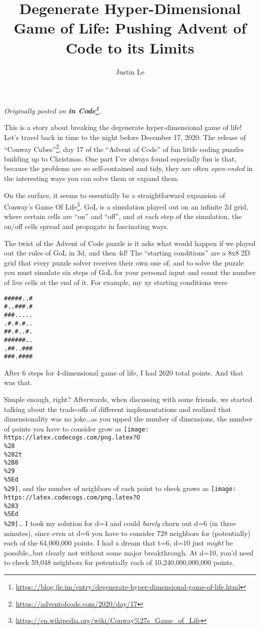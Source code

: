 \documentclass[]{article}
\title{Degenerate Hyper-Dimensional Game of Life: Pushing Advent of Code to its Limits}
\author{Justin Le}
\renewcommand{\href}[2]{#2\footnote{\url{#1}}}
\begin{document}
\maketitle

\emph{Originally posted on
\textbf{\href{https://blog.jle.im/entry/degenerate-hyper-dimensional-game-of-life.html}{in
Code}}.}

This is a story about breaking the degenerate hyper-dimensional game of life!
Let's travel back in time to the night before December 17, 2020: The release of
\href{https://adventofcode.com/2020/day/17}{``Conway Cubes''}, day 17 of the
``Advent of Code'' of fun little coding puzzles building up to Christmas. One
part I've always found especially fun is that, because the problems are so
self-contained and tidy, they are often \emph{open-ended} in the interesting
ways you can solve them or expand them.

On the surface, it seems to essentially be a straightforward expansion of
\href{https://en.wikipedia.org/wiki/Conway\%27s_Game_of_Life}{Conway's Game Of
Life}. GoL is a simulation played out on an infinite 2d grid, where certain
cells are ``on'' and ``off'', and at each step of the simulation, the on/off
cells spread and propagate in fascinating ways.

The twist of the Advent of Code puzzle is it asks what would happen if we played
out the rules of GoL in 3d, and then 4d! The ``starting conditions'' are a 8x8
2D grid that every puzzle solver receives their own one of, and to solve the
puzzle you must simulate six steps of GoL for your personal input and count the
number of live cells at the end of it. For example, my xy starting conditions
were

\begin{verbatim}
#####..#
#..###.#
###.....
.#.#.#..
##.#..#.
######..
.##..###
###.####
\end{verbatim}

After 6 steps for 4-dimensional game of life, I had 2620 total points. And that
was that.

Simple enough, right? Afterwards, when discussing with some friends, we started
talking about the trade-offs of different implementations and realized that
dimensionality was no joke\ldots as you upped the number of dimensions, the
number of points you have to consider grow as
\texttt{[image: https://latex.codecogs.com/png.latex?O\\\%28\\\%282t\\\%2B8\\\%29\\\%5Ed\\\%29]},
and the number of neighbors of each point to check grows as
\texttt{[image: https://latex.codecogs.com/png.latex?O\\\%283\\\%5Ed\\\%29]}\ldots{} I
took my solution for d=4 and could \emph{barely} churn out d=6 (in three
minutes), since even at d=6 you have to consider 728 neighbors for (potentially)
each of the 64,000,000 points. I had a dream that t=6, d=10 just \emph{might} be
possible\ldots but clearly not without some major breakthrough. At d=10, you'd
need to check 59,048 neighbors for potentially each of 10,240,000,000,000
points.
\end{document}
